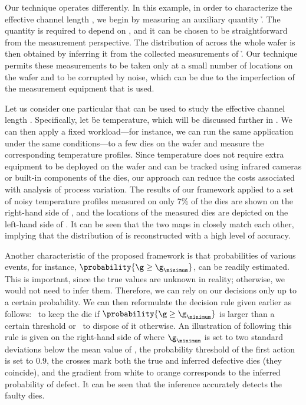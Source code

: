 Our technique operates differently. In this example, in order to characterize
the effective channel length \g, we begin by measuring an auxiliary quantity \h.
The quantity is required to depend on \g, and it can be chosen to be
straightforward from the measurement perspective. The distribution of \g across
the whole wafer is then obtained by inferring it from the collected measurements
of \h. Our technique permits these measurements to be taken only at a small
number of locations on the wafer and to be corrupted by noise, which can be due
to the imperfection of the measurement equipment that is used.

Let us consider one particular \h that can be used to study the effective
channel length \g. Specifically, let \h be temperature, which will be discussed
further in . We can then apply a fixed workload---for
instance, we can run the same application under the same conditions---to a few
dies on the wafer and measure the corresponding temperature profiles. Since
temperature does not require extra equipment to be deployed on the wafer and can
be tracked using infrared cameras \cite{mesa-martinez2007} or built-in
components of the dies, our approach can reduce the costs associated with
analysis of process variation. The results of our framework applied to a set of
noisy temperature profiles measured on only 7\% of the dies are shown on the
right-hand side of , and the locations of
the measured dies are depicted on the left-hand side of
. It can be seen that the two maps in
 closely match each other, implying that the
distribution of \g is reconstructed with a high level of accuracy.

Another characteristic of the proposed framework is that probabilities of
various events, for instance, $\probability{\g \geq \g_\minimum}$, can be
readily estimated. This is important, since the true values are unknown in
reality; otherwise, we would not need to infer them. Therefore, we can rely on
our decisions only up to a certain probability. We can then reformulate the
decision rule given earlier as follows: \one~to keep the die if $\probability{\g
\geq \g_\minimum}$ is larger than a certain threshold or \two~to dispose of it
otherwise. An illustration of following this rule is given on the right-hand
side of  where $\g_\minimum$ is set to two
standard deviations below the mean value of \g, the probability threshold of the
first action is set to 0.9, the crosses mark both the true and inferred
defective dies (they coincide), and the gradient from white to orange
corresponds to the inferred probability of defect. It can be seen that the
inference accurately detects the faulty dies.

